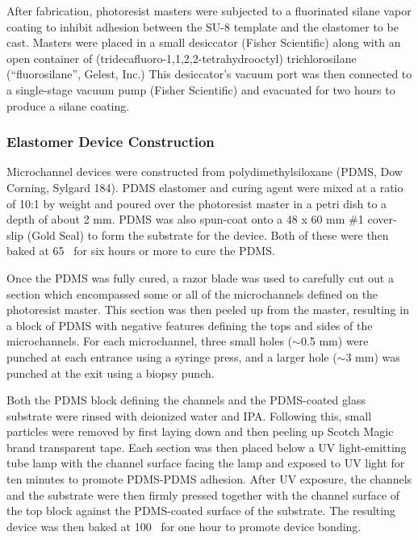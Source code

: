 After fabrication, photoresist masters were subjected to a fluorinated silane vapor coating to inhibit adhesion
between the SU-8 template and the elastomer to be cast. Masters were placed in a small desiccator (Fisher Scientific)
along with an open container of (tridecafluoro-1,1,2,2-tetrahydrooctyl) trichlorosilane (``fluorosilane'', Gelest, Inc.)
This desiccator's vacuum port was then connected to a single-stage vacuum pump 
(Fisher Scientific) and evacuated for two hours to produce
a silane coating.

\subsubsection{Elastomer Device Construction}

Microchannel devices were constructed from polydimethylsiloxane (PDMS, Dow Corning, Sylgard 184). PDMS
elastomer and curing agent were mixed at a ratio of 10:1 by weight and poured over the photoresist master 
in a petri dish to a depth of about 2 mm.  PDMS was also spun-coat onto a 48 x 60 mm \#1 cover-slip (Gold Seal)
to form the substrate for the device.
Both of these  were then baked at 65 \degC~for six hours or more to cure
the PDMS.  

Once the PDMS was fully cured, a razor blade was used to carefully cut out a section which encompassed some or all of
the microchannels defined on the photoresist master. This section was then peeled up from the master, resulting
in a block of PDMS with negative features defining the tops and sides of the microchannels.
For each microchannel, three small holes ($\sim$0.5 mm) were punched at each entrance using a syringe press, and a larger
hole ($\sim$3 mm) was punched at the exit using a biopsy punch.

Both the PDMS block defining the channels and the PDMS-coated glass substrate were rinsed
with deionized water and IPA. Following this, small particles were removed by first laying down and then peeling up
Scotch Magic brand transparent tape.  Each section was then placed below a UV light-emitting
tube lamp with the channel surface facing the lamp and exposed to UV light for ten minutes to promote PDMS-PDMS
adhesion.  After UV exposure, the channels and the 
substrate were then firmly pressed together with the channel surface of the top
block against the PDMS-coated surface of the substrate.  The resulting device was then baked at 100 \degC~for one hour
to promote device bonding.

